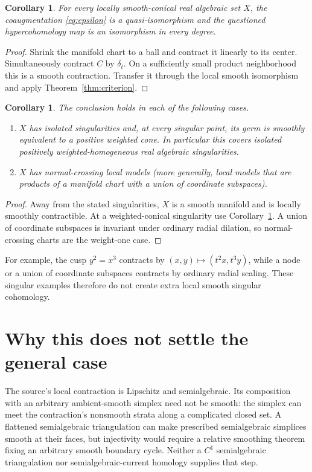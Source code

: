 \documentclass[11pt]{article}
\newtheorem{corollary}[theorem]{Corollary}
\begin{document}
\begin{corollary}\label{cor:cone}
For every locally smooth-conical real algebraic set $X$, the coaugmentation
\eqref{eq:epsilon} is a quasi-isomorphism and the questioned
hypercohomology map is an isomorphism in every degree.
\end{corollary}

\begin{proof}
Shrink the manifold chart to a ball and contract it linearly to its center.
Simultaneously contract $C$ by $\delta_t$.  On a sufficiently small product
neighborhood this is a smooth contraction.  Transfer it through the local
smooth isomorphism and apply Theorem~\ref{thm:criterion}.
\end{proof}

\begin{corollary}\label{cor:examples}
The conclusion holds in each of the following cases.
\begin{enumerate}
\item $X$ has isolated singularities and, at every singular point, its germ is
smoothly equivalent to a positive weighted cone.  In particular this covers
isolated positively weighted-homogeneous real algebraic singularities.
\item $X$ has normal-crossing local models (more generally, local models that
are products of a manifold chart with a union of coordinate subspaces).
\end{enumerate}
\end{corollary}

\begin{proof}
Away from the stated singularities, $X$ is a smooth manifold and is locally
smoothly contractible.  At a weighted-conical singularity use
Corollary~\ref{cor:cone}.  A union of coordinate subspaces is invariant under
ordinary radial dilation, so normal-crossing charts are the weight-one case.
\end{proof}

For example, the cusp $y^2=x^3$ contracts by
$(x,y)\mapsto(t^2x,t^3y)$, while a node or a union of coordinate subspaces
contracts by ordinary radial scaling.  These singular examples therefore do
not create extra local smooth singular cohomology.

\section{Why this does not settle the general case}

The source's local contraction is Lipschitz and semialgebraic.  Its
composition with an arbitrary ambient-smooth simplex need not be smooth:
the simplex can meet the contraction's nonsmooth strata along a complicated
closed set.  A flattened semialgebraic triangulation can make prescribed
semialgebraic simplices smooth at their faces, but injectivity would require a
relative smoothing theorem fixing an arbitrary smooth boundary cycle.
Neither a $C^1$ semialgebraic triangulation nor semialgebraic-current homology
supplies that step.
\end{document}
